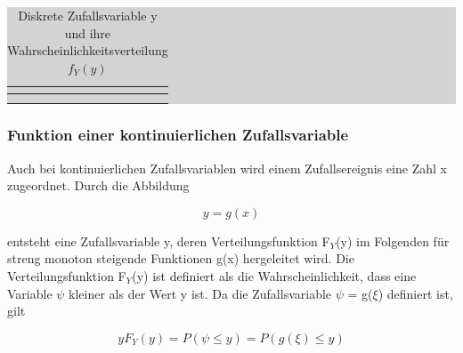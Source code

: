 \begin{table}[H]
\caption{Diskrete Zufallsvariable y und ihre Wahrscheinlichkeitsverteilung $f_{Y}(y)$}
\setlength{\fboxsep}{0pt}%
\colorbox{lightgray}{%
%
\begin{tabular}{| c | c | c | c |}
\hline

\parbox[c][0.28in][c]{1.54in}{\smallskip\centering\textbf{}} &
\parbox[c][0.28in][c]{1.54in}{} &
\parbox[c][0.28in][c]{1.54in}{} &
\parbox[c][0.28in][c]{1.54in}{} \\ \hline

\parbox[c][0.28in][c]{1.54in}{\smallskip\centering\textbf{}} &
\parbox[c][0.28in][c]{1.54in}{} &
\parbox[c][0.28in][c]{1.54in}{} &
\parbox[c][0.28in][c]{1.54in}{}  \\ \hline

\parbox[c][0.28in][c]{1.54in}{\smallskip\centering\textbf{}} &
\parbox[c][0.28in][c]{1.54in}{} &
\parbox[c][0.28in][c]{1.54in}{} &
\parbox[c][0.28in][c]{1.54in}{}  \\ \hline

\end{tabular}%
}\bigskip
\label{tab:fourten}
\end{table}

\subsubsection{Funktion einer kontinuierlichen Zufallsvariable}

\noindent Auch bei kontinuierlichen Zufallsvariablen wird einem Zufallsereignis eine Zahl x zugeordnet. Durch die Abbildung

\begin{equation}\label{eq:foureightytwo}
y=g(x)
\end{equation}

\noindent entsteht eine Zufallsvariable y, deren Verteilungsfunktion F$_{Y}$(y) im Folgenden f\"{u}r streng monoton steigende Funktionen g(x) hergeleitet wird. Die Verteilungsfunktion F$_{Y}$(y) ist definiert als die Wahrscheinlichkeit, dass eine Variable $\psi$ kleiner als der Wert y ist. Da die Zufallsvariable $\psi$ = g($\xi$) definiert ist, gilt

\begin{equation}\label{eq:foureightythree}
yF_{Y} (y)=P\left(\psi \le y\right)=P\left(g(\xi)\le y\right)
\end{equation}

